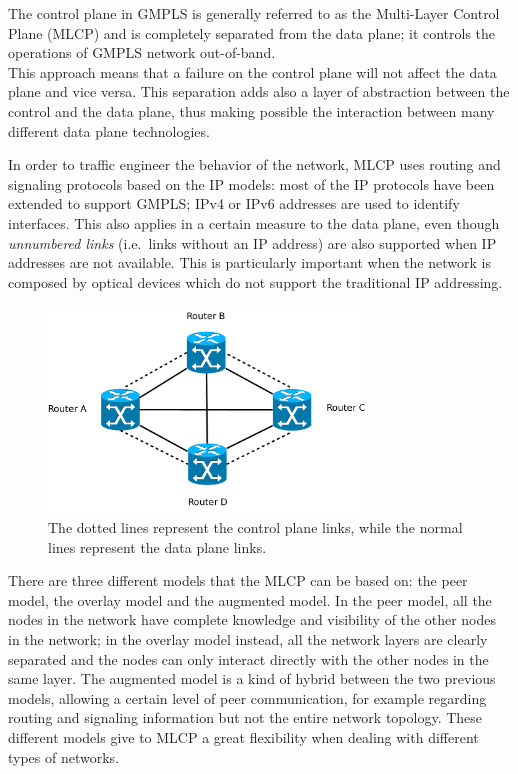 \documentclass[10pt,a4paper]{report}
\begin{document}
The control plane in GMPLS is generally referred to as the Multi-Layer
Control Plane (MLCP) and is completely separated from the data plane;
it controls the operations of GMPLS network out-of-band. \\
This approach means that a failure on the control plane will not
affect the data plane and vice versa. This separation adds also a
layer of abstraction between the control and the data plane, thus
making possible the interaction between many different data plane
technologies.

In order to traffic engineer the behavior of the network, MLCP uses
routing and signaling protocols based on the IP models: most of the IP
protocols have been extended to support GMPLS; IPv4 or IPv6 addresses
are used to identify interfaces. This also applies in a certain
measure to the data plane, even though \textit{unnumbered links}
(i.e.\ links without an IP address) are also supported when IP
addresses are not available. This is particularly important when the
network is composed by optical devices which do not support the
traditional IP addressing.

\begin{figure}[!htbp]
  \centering
  \includegraphics[width=0.75\textwidth]{img/gmpls_mlcp}
  \caption[MPLS network]{The dotted lines represent the control plane
    links, while the normal lines represent the data plane links.}
  \label{fig:gmpls_mlcp}
\end{figure}

There are three different models that the MLCP can be based on: the
peer model, the overlay model and the augmented model. In the peer
model, all the nodes in the network have complete knowledge and
visibility of the other nodes in the network; in the overlay model
instead, all the network layers are clearly separated and the nodes
can only interact directly with the other nodes in the same layer. The
augmented model is a kind of hybrid between the two previous models,
allowing a certain level of peer communication, for example regarding
routing and signaling information but not the entire network
topology. These different models give to MLCP a great flexibility when
dealing with different types of networks.
\end{document}
